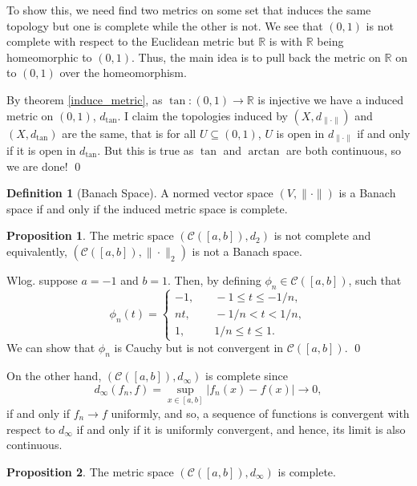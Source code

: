 \documentclass[
]{article}
\theoremstyle{definition}
\newtheorem{prop}{Proposition}
\theoremstyle{definition}
\newtheorem{definition}{Definition}[section]
\begin{document}
To show this, we need find two metrics on some set that induces the same
topology but one is complete while the other is not. We see that
\((0, 1)\) is not complete with respect to the Euclidean metric but
\(\mathbb{R}\) is with \(\mathbb{R}\) being homeomorphic to \((0, 1)\).
Thus, the main idea is to pull back the metric on \(\mathbb{R}\) on to
\((0, 1)\) over the homeomorphism.

By theorem \ref{induce_metric}, as \(\tan : (0, 1) \to \mathbb{R}\) is
injective we have a induced metric on \((0, 1)\), \(d_{\tan}\). I claim
the topologies induced by \((X, d_{\| \cdot \|})\) and \((X, d_{\tan})\)
are the same, that is for all \(U \subseteq (0, 1)\), \(U\) is open in
\(d_{\| \cdot \|}\) if and only if it is open in \(d_{\tan}\). But this
is true as \(\tan\) and \(\arctan\) are both continuous, so we are done!
\qed

\begin{definition}[Banach Space]
  A normed vector space \((V, \|\cdot\|)\) is a Banach space if and only if the 
  induced metric space is complete.
\end{definition}

\begin{prop}
  The metric space \((\mathcal{C}([a, b]), d_2)\) is not complete and equivalently, 
  \((\mathcal{C}([a, b]), \| \cdot \|_2)\) is not a Banach space.
\end{prop}
\proof

Wlog. suppose \(a = -1\) and \(b = 1\). Then, by defining
\(\phi_n \in \mathcal{C}([a, b])\), such that
\[\phi_n(t) = \begin{cases}
      - 1, &\quad -1 \le t \le - 1 / n,\\
      nt, &\quad -1 / n < t < 1 / n,\\
      1, &\quad 1 / n \le t \le 1.  \end{cases}\] We can show that
\(\phi_n\) is Cauchy but is not convergent in \(\mathcal{C}([a, b])\).
\qed

On the other hand, \((\mathcal{C}([a, b]), d_\infty)\) is complete since
\[d_\infty(f_n, f) = \sup_{x \in [a, b]} \left| f_n(x) - f(x)\right| \to 0,\]
if and only if \(f_n \to f\) uniformly, and so, a sequence of functions
is convergent with respect to \(d_\infty\) if and only if it is
uniformly convergent, and hence, its limit is also continuous.

\begin{prop}
  The metric space \((\mathcal{C}([a, b]), d_\infty)\) is complete.
\end{prop}
\proof
\end{document}

